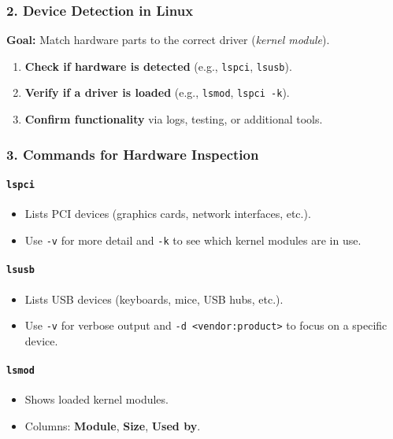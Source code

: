 \documentclass[12pt,a4paper]{report}
\begin{document}
\subsubsection*{2. Device Detection in Linux}
\textbf{Goal:} Match hardware parts to the correct driver (\textit{kernel module}).
\begin{enumerate}
    \item \textbf{Check if hardware is detected} (e.g., \texttt{lspci}, \texttt{lsusb}).
    \item \textbf{Verify if a driver is loaded} (e.g., \texttt{lsmod}, \texttt{lspci -k}).
    \item \textbf{Confirm functionality} via logs, testing, or additional tools.
\end{enumerate}

\subsubsection*{3. Commands for Hardware Inspection}
\paragraph{\texttt{lspci}}
\begin{itemize}
    \item Lists PCI devices (graphics cards, network interfaces, etc.).
    \item Use \texttt{-v} for more detail and \texttt{-k} to see which kernel modules are in use.
\end{itemize}

\paragraph{\texttt{lsusb}}
\begin{itemize}
    \item Lists USB devices (keyboards, mice, USB hubs, etc.).
    \item Use \texttt{-v} for verbose output and \texttt{-d <vendor:product>} to focus on a specific device.
\end{itemize}

\paragraph{\texttt{lsmod}}
\begin{itemize}
    \item Shows loaded kernel modules.
    \item Columns: \textbf{Module}, \textbf{Size}, \textbf{Used by}.
\end{itemize}
\end{document}

